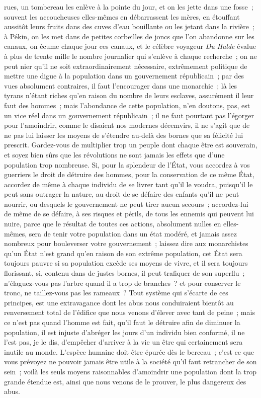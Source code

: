 \documentclass[french,twoside]{book} %
\begin{document}
rues, un tombereau les enlève à la pointe du jour, et on les jette dans une fosse ; souvent les accoucheuses elles-mêmes en débarrassent les mères, en étouffant aussitôt leurs fruits dans des cuves d’eau bouillante ou les jetant dans la rivière ; à Pékin, on les met dans de petites corbeilles de joncs que l’on abandonne sur les canaux, on écume chaque jour ces canaux, et le célèbre voyageur {\itshape Du Halde} évalue à plus de trente mille le nombre journalier qui s’enlève à chaque recherche ; on ne peut nier qu’il ne soit extraordinairement nécessaire, extrêmement politique de mettre une digue à la population dans un gouvernement républicain ; par des vues absolument contraires, il faut l’encourager dans une monarchie ; là les tyrans n’étant riches qu’en raison du nombre de leurs esclaves, assurément il leur faut des hommes ; mais l’abondance de cette population, n’en doutons, pas, est un vice réel dans un gouvernement républicain ; il ne faut pourtant pas l’égorger pour l’amoindrir, comme le disaient nos modernes décemvirs, il ne s’agit que de ne pas lui laisser les moyens de s’étendre au-delà des bornes que sa félicité lui prescrit. Gardez-vous de multiplier trop un peuple dont chaque être est souverain, et soyez bien sûrs que les révolutions ne sont jamais les effets que d’une population trop nombreuse. Si, pour la splendeur de l’État, vous accordez à vos guerriers le droit de détruire des hommes, pour la conservation de ce même État, accordez de même à chaque individu de se livrer tant qu’il le voudra, puisqu’il le peut sans outrager la nature, au droit de se défaire des enfants qu’il ne peut nourrir, ou desquels le gouvernement ne peut tirer aucun secours ; accordez-lui de même de se défaire, à ses risques et périls, de tous les ennemis qui peuvent lui nuire, parce que le résultat de toutes ces actions, absolument nulles en elles-mêmes, sera de tenir votre population dans un état modéré, et jamais assez nombreux pour bouleverser votre gouvernement ; laissez dire aux monarchistes qu’un État n’est grand qu’en raison de son extrême population, cet État sera toujours pauvre si sa population excède ses moyens de vivre, et il sera toujours florissant, si, contenu dans de justes bornes, il peut trafiquer de son superflu ; n’élaguez-vous pas l’arbre quand il a trop de branches ? et pour conserver le tronc, ne taillez-vous pas les rameaux ? Tout système qui s’écarte de ces principes, est une extravagance dont les abus nous conduiraient bientôt au renversement total de l’édifice que nous venons d’élever avec tant de peine ; mais ce n’est pas quand l’homme est fait, qu’il faut le détruire afin de diminuer la population, il est injuste d’abréger les jours d’un individu bien conformé, il ne l’est pas, je le dis, d’empêcher d’arriver à la vie un être qui certainement sera inutile au monde. L’espèce humaine doit être épurée dès le berceau ; c’est ce que vous prévoyez ne pouvoir jamais être utile à la société qu’il faut retrancher de son sein ; voilà les seuls moyens raisonnables d’amoindrir une population dont la trop grande étendue est, ainsi que nous venons de le prouver, le plus dangereux des abus.\par
\end{document}
